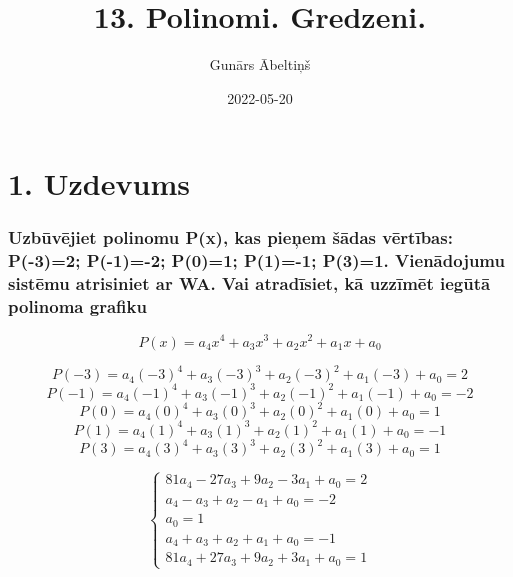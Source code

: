 \documentclass{article}
\title{13. Polinomi. Gredzeni.}
\author{Gunārs Ābeltiņš}
\date{2022-05-20}
\begin{document}
\maketitle

\section*{1. Uzdevums}
\subsubsection*{Uzbūvējiet polinomu P(x), kas pieņem šādas vērtības: P(-3)=2; P(-1)=-2; P(0)=1; P(1)=-1; P(3)=1. Vienādojumu sistēmu atrisiniet ar WA. Vai atradīsiet, kā uzzīmēt iegūtā polinoma grafiku}

\begin{equation*}
    P(x) = a_4 x^4 + a_3 x^3 + a_2 x^2 + a_1 x + a_0
\end{equation*}

\begin{equation*}
    P(-3) = a_4 (-3)^4 + a_3 (-3)^3 + a_2 (-3)^2 + a_1 (-3) + a_0 = 2
\end{equation*}
\begin{equation*}
    P(-1) = a_4 (-1)^4 + a_3 (-1)^3 + a_2 (-1)^2 + a_1 (-1) + a_0 = -2
\end{equation*}
\begin{equation*}
    P(0) = a_4 (0)^4 + a_3 (0)^3 + a_2 (0)^2 + a_1 (0) + a_0 = 1
\end{equation*}
\begin{equation*}
    P(1) = a_4 (1)^4 + a_3 (1)^3 + a_2 (1)^2 + a_1 (1) + a_0 = -1
\end{equation*}
\begin{equation*}
    P(3) = a_4 (3)^4 + a_3 (3)^3 + a_2 (3)^2 + a_1 (3) + a_0 = 1
\end{equation*}

\begin{equation*}
    \begin{cases}
        81a_4 - 27a_3 + 9a_2 - 3a_1 + a_0 = 2 \\
        a_4 - a_3 + a_2 - a_1 + a_0 = -2      \\
        a_0 = 1                               \\
        a_4 + a_3 + a_2 + a_1 + a_0 = -1      \\
        81a_4 + 27a_3 + 9a_2 + 3a_1 + a_0 = 1
    \end{cases}
\end{equation*}
\end{document}
